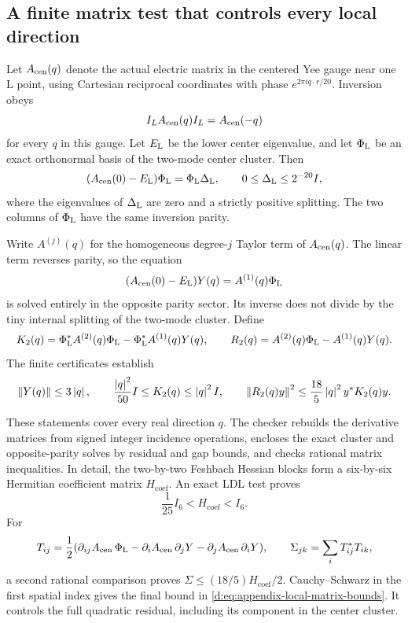 \subsection{A finite matrix test that controls every local direction}

Let \(A_{\rm cen}(q)\) denote the actual electric matrix in the centered
Yee gauge near one \(\mathrm{L}\) point, using Cartesian reciprocal coordinates
with phase \(e^{2\pi iq\cdot r/20}\). Inversion obeys
\[
 I_LA_{\rm cen}(q)I_L=A_{\rm cen}(-q)
\]
for every \(q\) in this gauge. Let \(E_{\rm L}\) be the lower center eigenvalue,
and let \(\Phi_{\rm L}\) be an exact orthonormal basis of the two-mode center
cluster. Then
\[
 (A_{\rm cen}(0)-E_{\rm L})\Phi_{\rm L}=\Phi_{\rm L}\Delta_{\rm L},\qquad
 0\le\Delta_{\rm L}\le2^{-20}I,
\]
where the eigenvalues of \(\Delta_{\rm L}\) are zero and a strictly positive
splitting. The two columns of \(\Phi_{\rm L}\) have the same inversion parity.

Write \(A^{(j)}(q)\) for the homogeneous degree-\(j\) Taylor term of
\(A_{\rm cen}(q)\). The linear term reverses parity, so the equation
\[
 (A_{\rm cen}(0)-E_{\rm L})Y(q)=A^{(1)}(q)\Phi_{\rm L}
\]
is solved entirely in the opposite parity sector. Its inverse does not
divide by the tiny internal splitting of the two-mode cluster. Define
\[
 K_2(q)=\Phi_{\rm L}^*A^{(2)}(q)\Phi_{\rm L}-\Phi_{\rm L}^*A^{(1)}(q)Y(q),\qquad
 R_2(q)=A^{(2)}(q)\Phi_{\rm L}-A^{(1)}(q)Y(q).
\]
The finite certificates establish
\begin{equation}
 \left\lVert Y(q)\right\rVert\le3\left\lvert q\right\rvert,\qquad
 \frac{\left\lvert q\right\rvert^2}{50}I\le K_2(q)\le\left\lvert q\right\rvert^2I,\qquad
 \left\lVert R_2(q)y\right\rVert^2
 \le\frac{18}{5}\left\lvert q\right\rvert^2y^*K_2(q)y.
 \label{d:eq:appendix-local-matrix-bounds}
\end{equation}

These statements cover every real direction \(q\). The checker rebuilds
the derivative matrices from signed integer incidence operations,
encloses the exact cluster and opposite-parity solves by residual and
gap bounds, and checks rational matrix inequalities. In detail, the
two-by-two Feshbach Hessian blocks form a six-by-six Hermitian coefficient
matrix \(H_{\mathrm{coef}}\). An exact LDL test proves
\[
 \frac1{25}I_6<H_{\mathrm{coef}}<I_6.
\]
For
\[
 T_{ij}=\frac12
   (\partial_{ij}A_{\rm cen}\,\Phi_{\rm L}-\partial_iA_{\rm cen}\,\partial_jY-\partial_jA_{\rm cen}\,\partial_iY),
 \qquad \Sigma_{jk}=\sum_iT_{ij}^*T_{ik},
\]
a second rational comparison proves
\(\Sigma\le(18/5)H_{\mathrm{coef}}/2\).
Cauchy--Schwarz in the first spatial index gives the final bound in
\eqref{d:eq:appendix-local-matrix-bounds}. It controls the full quadratic
residual, including its component in the center cluster.


